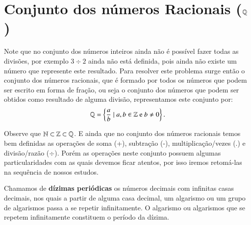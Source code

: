 \section{Conjunto dos números Racionais (\texorpdfstring{$\mathbb{Q}$}{Q})}

Note que no conjunto dos números inteiros ainda não é possível fazer todas as divisões, por exemplo $3 \div 2$ ainda não está definida, pois ainda não existe um número que represente este resultado. Para resolver este problema surge então o conjunto dos números racionais, que é formado por todos os números que podem ser escrito em forma de fração, ou seja o conjunto dos números que podem ser obtidos como resultado de alguma divisão, representamos este conjunto por:
\[\mathbb{Q}= \left\{ \frac{a}{b} \mid a, b \in \mathbb{Z} \text{ e } b \neq 0 \right\}.\]

Observe que $\mathbb{N} \subset \mathbb{Z} \subset \mathbb{Q}$. E ainda que no conjunto dos números racionais temos bem definidas as operações de soma (+), subtração (-), multiplicação/vezes (.) e divisão/razão ($\div$). Porém as operações neste conjunto possuem algumas particularidades com as quais devemos ficar atentos, por isso iremos retomá-las na sequência de nossos estudos.

 \vskip0.3cm
 \colorbox{azul}{
 \begin{minipage}{0.9\linewidth}
 \begin{center}
  Chamamos de \textbf{dízimas periódicas} os números decimais com infinitas casas decimais, nos quais a partir de alguma casa decimal, um algarismo ou um grupo de algarismos passa a se repetir infinitamente. O algarismo ou algarismos que se repetem infinitamente constituem o período da dízima.
 \end{center}
 \end{minipage}}
 \vskip0.3cm

